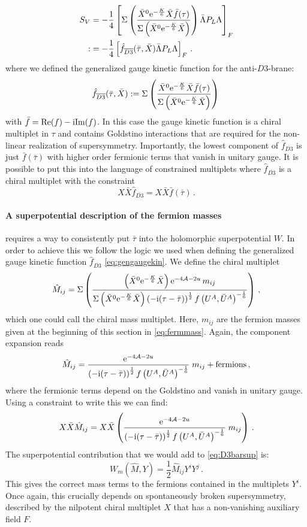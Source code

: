 \documentclass[12pt]{report}
\newcommand{\be}{\begin{equation}}
\newcommand{\ee}{\end{equation}}
\newcommand{\bea}{\begin{equation}\begin{aligned}}
\newcommand{\eea}{\end{aligned}\end{equation}}
\def\rmi{{\rm i}}
\def\rme{{\rm e}}
\def\rmre{{\rm Re}}
\def\rmim{{\rm Im}}
\begin{document}
\bea 
S_V &= -\frac{1}{4} \left[\Sigma\left(\frac{\bar{X}^0 \rme^{-\frac{K}{6}} \bar{X} \bar{f}(\tau)}{\Sigma \left(\bar{X}^0\rme^{-\frac{K}{6}}\bar{X}\right)}\right)\bar{\Lambda}P_L\Lambda\right]_F\\
:&= -\frac{1}{4} \left[\hat{f}_{\overline{D3}}(\bar{\tau},\bar{X})\bar{\Lambda}P_L\Lambda\right]_F\,.
\eea 
where we defined the generalized gauge kinetic function for the anti-$D3$-brane:
\bea 
\hat{f}_{\overline{D3}}(\bar{\tau},\bar{X}) := \Sigma\left(\frac{\bar{X}^0 \rme^{-\frac{K}{6}} \bar{X} \bar{f}(\tau)}{\Sigma \left(\bar{X}^0\rme^{-\frac{K}{6}}\bar{X}\right)}\right)\,
\label{eq:gengaugekin}
\eea
with $\bar{f} = \rmre(f)-\rmi \rmim(f)$. In this case the gauge kinetic function is a chiral multiplet in $\tau$ and contains Goldstino interactions that are required for the non-linear realization of supersymmetry. Importantly, the lowest component of $\hat{f}_{\overline{D3}}$ is just $\bar{f}(\bar{\tau})$ with higher order fermionic terms that vanish in unitary gauge. It is possible to put this into the language of constrained multiplets where $\hat{f}_{\overline{D3}}$ is a chiral multiplet with the constraint
\be 
X\bar{X}\hat{f}_{\overline{D3}} = X \bar{X}\bar{f}(\bar{\tau})\,.
\ee

\paragraph{A superpotential description of the fermion masses} requires a way to consistently put $\bar{\tau}$ into the holomorphic superpotential $W$. In order to achieve this we follow the logic we used when defining the generalized gauge kinetic function $\hat{f}_{\overline{D3}}$ \eqref{eq:gengaugekin}. We define the chiral multiplet
\be 
\hat{M}_{ij} = \Sigma \left(\frac{\left(\bar{X}^0 \rme^{-\frac{K}{6}}\bar{X}\right)\rme^{-4\mathcal{A}-2u}\,m_{ij}}{\Sigma\left(\bar{X}^0 \rme^{-\frac{K}{6}}\bar{X}\right)\left(-\rmi (\tau-\bar{\tau})\right)^{\frac{1}{2}}f\left(U^A,\bar{U}^A\right)^{-\frac{1}{6}}}\right)\,,
\ee
which one could call the chiral mass multiplet. Here, $m_{ij}$ are the fermion masses given at the beginning of this section in \eqref{eq:fermmass}. Again, the component expansion reads
\be 
\hat{M}_{ij} = \frac{\rme^{-4\mathcal{A}-2u}}{\left(-\rmi (\tau-\bar{\tau})\right)^{\frac{1}{2}}f\left(U^A,\bar{U}^A\right)^{-\frac{1}{6}}} \; m_{ij} + \text{fermions}\,,
\ee
where the fermionic terms depend on the Goldstino and vanish in unitary gauge. Using a constraint to write this we can find:
\be 
X\bar{X} \hat{M}_{ij} = X \bar{X} \left( \frac{\rme^{-4\mathcal{A}-2u}}{\left(-\rmi (\tau-\bar{\tau})\right)^{\frac{1}{2}}f\left(U^A,\bar{U}^A\right)^{-\frac{1}{6}}}\; m_{ij} \right)\,.
\ee 
The superpotential contribution that we would add to \eqref{eq:D3barsup} is:
\be 
W_m(\hat{M},Y) = \frac{1}{2} \hat{M}_{ij}Y^iY^j\,.
\ee
This gives the correct mass terms to the fermions contained in the multiplets $Y^i$. Once again, this crucially depends on spontaneously broken supersymmetry, described by the nilpotent chiral multiplet $X$ that has a non-vanishing auxiliary field $F$.
\end{document}
